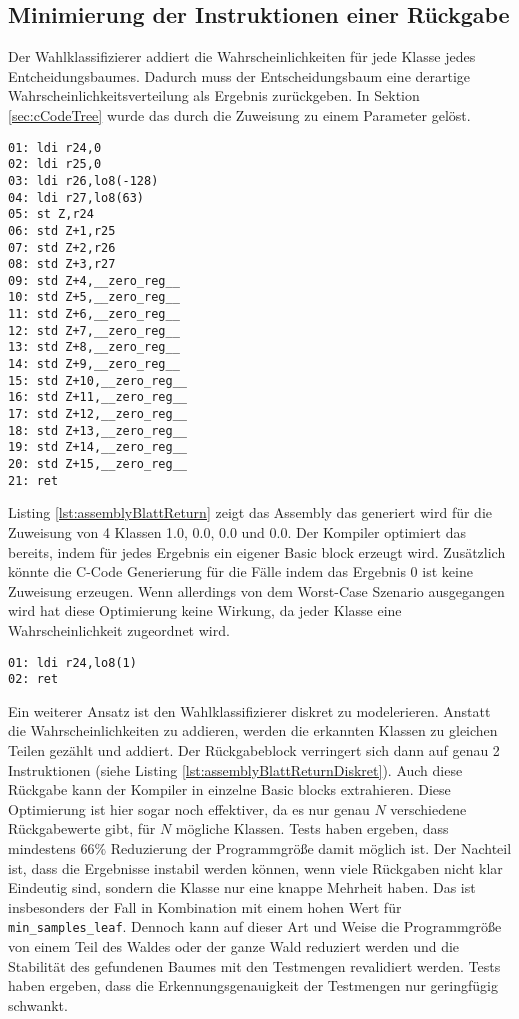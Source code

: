 \subsection{Minimierung der Instruktionen einer Rückgabe}
Der Wahlklassifizierer addiert die Wahrscheinlichkeiten für jede Klasse jedes Entcheidungsbaumes. Dadurch muss der Entscheidungsbaum eine derartige Wahrscheinlichkeitsverteilung als Ergebnis zurückgeben. In
Sektion \ref{sec:cCodeTree} wurde das durch die Zuweisung zu einem Parameter gelöst.
\begin{lstlisting}[label=lst:assemblyBlattReturn,caption={Beispiel des Assemblycodes der Rückgabe der Wahrscheinlichkeitsverteilung eines Entscheidungsbaumes.}]
01: ldi r24,0
02: ldi r25,0
03: ldi r26,lo8(-128)
04: ldi r27,lo8(63)
05: st Z,r24
06: std Z+1,r25
07: std Z+2,r26
08: std Z+3,r27
09: std Z+4,__zero_reg__
10: std Z+5,__zero_reg__
11: std Z+6,__zero_reg__
12: std Z+7,__zero_reg__
13: std Z+8,__zero_reg__
14: std Z+9,__zero_reg__
15: std Z+10,__zero_reg__
16: std Z+11,__zero_reg__
17: std Z+12,__zero_reg__
18: std Z+13,__zero_reg__
19: std Z+14,__zero_reg__
20: std Z+15,__zero_reg__
21: ret
\end{lstlisting}
Listing \ref{lst:assemblyBlattReturn} zeigt das Assembly das generiert wird für die Zuweisung von 4 Klassen 1.0, 0.0, 0.0 und 0.0. Der Kompiler optimiert das bereits, indem für jedes Ergebnis ein eigener
Basic block erzeugt wird. Zusätzlich könnte die C-Code Generierung für die Fälle indem das Ergebnis 0 ist keine Zuweisung erzeugen. Wenn allerdings von dem Worst-Case Szenario ausgegangen wird
hat diese Optimierung keine Wirkung, da jeder Klasse eine Wahrscheinlichkeit zugeordnet wird.
\begin{lstlisting}[label=lst:assemblyBlattReturnDiskret,caption={Beispiel des Assemblycodes der Rückgabe eines diskreten Wahlklassifizierers.}]
01: ldi r24,lo8(1)
02: ret
\end{lstlisting}
Ein weiterer Ansatz ist den Wahlklassifizierer diskret zu modelerieren. Anstatt die Wahrscheinlichkeiten zu addieren, werden die erkannten Klassen zu gleichen Teilen gezählt und addiert. Der Rückgabeblock
verringert sich dann auf genau 2 Instruktionen (siehe Listing \ref{lst:assemblyBlattReturnDiskret}). Auch diese Rückgabe kann der Kompiler in einzelne Basic blocks extrahieren. Diese Optimierung ist hier sogar
noch effektiver, da es nur genau $N$ verschiedene Rückgabewerte gibt, für $N$ mögliche Klassen. Tests haben ergeben, dass mindestens $66\%$ Reduzierung der Programmgröße damit möglich ist.
\newline
\newline
Der Nachteil ist, dass die Ergebnisse instabil werden können, wenn viele Rückgaben nicht klar Eindeutig sind, sondern die Klasse nur eine knappe Mehrheit haben. Das ist insbesonders der Fall in
Kombination mit einem hohen Wert für \texttt{min\_samples\_leaf}. Dennoch kann auf dieser Art und Weise die Programmgröße von einem Teil des Waldes oder der ganze Wald reduziert werden und die
Stabilität des gefundenen Baumes mit den Testmengen revalidiert werden. Tests haben ergeben, dass die Erkennungsgenauigkeit der Testmengen nur geringfügig schwankt.